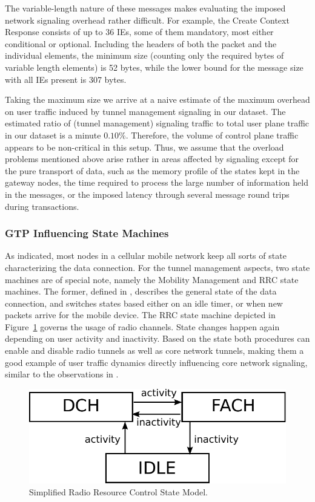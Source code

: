 The variable-length nature of these messages makes evaluating the imposed network signaling overhead rather difficult. For example, the Create Context Response consists of up to 36 \acp{IE}, some of them mandatory, most either conditional or optional. Including the headers of both the packet and the individual elements, the minimum size (counting only the required bytes of variable length elements) is 52 bytes, while the lower bound for the message size with all \acp{IE} present is 307 bytes.

Taking the maximum size we arrive at a naive estimate of the maximum overhead on user traffic induced by tunnel management signaling in our dataset. The estimated ratio of (tunnel management) signaling traffic to total user plane traffic in our dataset is a minute $0.10\%$. Therefore, the volume of control plane traffic appears to be non-critical in this setup. Thus, we assume that the overload problems mentioned above arise rather in areas affected by signaling except for the pure transport of data, such as the memory profile of the states kept in the gateway nodes, the time required to process the large number of information held in the messages, or the imposed latency through several message round trips during transactions.


\subsubsection{GTP Influencing State Machines}

As indicated, most nodes in a cellular mobile network keep all sorts of state characterizing the data connection. For the tunnel management aspects, two state machines are of special note, namely the Mobility Management and RRC state machines.
The former, defined in \cite{3gpp23.060}, describes the general state of the data connection, and switches states based either on an idle timer, or when new packets arrive for the mobile device. The \ac{RRC} state machine depicted in Figure~\ref{c4:fig:rrcstatemodel} governs the usage of radio channels. State changes happen again depending on user activity and inactivity.
Based on the state both procedures can enable and disable radio tunnels as well as core network tunnels, making them a good example of user traffic dynamics directly influencing core network signaling, similar to the observations in \cite{lee2007detection}.

\begin{figure}[htbp]
	\centering
	\includegraphics[width=0.8\columnwidth]{images/rrc-simplified-state-model.pdf}
	\caption{Simplified Radio Resource Control State Model.}
	\label{c4:fig:rrcstatemodel}
\end{figure}


